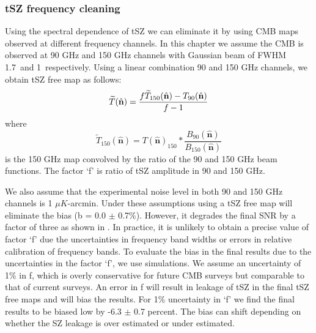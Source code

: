 \subsubsection{tSZ frequency cleaning}
\label{subsec:tszbias}
 Using the spectral dependence of tSZ we can eliminate it by using CMB maps observed at different frequency channels.
 In this chapter we assume the CMB is observed at 90 GHz and 150 GHz channels with Gaussian beam of FWHM 1.7\am\ and 1\am\ respectively.
Using a linear combination 90 and 150 GHz channels, we obtain tSZ free map as follows:
 \begin{equation}
\widetilde{T}(\hat{\textbf{n}})  =  \frac{f\widetilde{T}_{{150}}(\hat{\textbf{n}}) - T_{{90}}(\hat{\textbf{n}})}{f-1}\\
\end{equation}
where
 \begin{equation}
 \widetilde{T}_{{150}}(\hat{\textbf{n}})  =  T(\hat{\textbf{n}})_{{150}} \ast \frac{B_{{90}}(\hat{\textbf{n}})}{B_{{150}}(\hat{\textbf{n}})}
 \label{eq_smooth}
 \end{equation}
 is the 150 GHz map convolved by the ratio of the 90 and 150 GHz beam functions. 
 The factor `f' is ratio of tSZ amplitude in 90 and 150 GHz. %
 
We also assume that the experimental noise level in both 90 and 150 GHz channels is 1 $\mu K$-arcmin. 
  Under these assumptions using a tSZ free map will eliminate the bias (b = 0.0 $\pm$ 0.7\%). However, it degrades the final SNR by a factor of three as shown in \citet{baxter15}.
  In practice, it is unlikely to obtain a precise value of factor `f' due the uncertainties in frequency band widths or errors in relative calibration of frequency bands.
  To evaluate the bias in the final results due to the uncertainties in the factor `f', we use simulations. 
  We assume an uncertainty of 1\% in f, which is overly conservative for future CMB surveys but comparable to that of current surveys.
 An error in f will result in leakage of tSZ in the final tSZ free maps and will bias the results.
 For 1\% uncertainty in `f' we find the final results to be biased low by -6.3 $\pm$ 0.7 percent. 
 The bias can shift depending on whether the SZ leakage is over estimated or under estimated.
  
